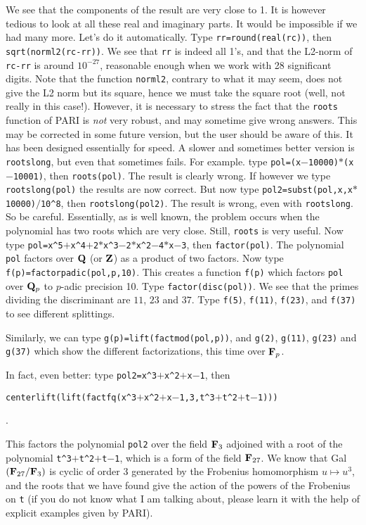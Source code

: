 We see that the components of the result are very close to 1. It is however
tedious to look at all these real and imaginary parts. It would be impossible
if we had many more. Let's do it automatically. Type {\tt rr=round(real(rc))},
then {\tt sqrt(norml2(rc-rr))}. We see that {\tt rr} is indeed all 1's, and
that the L2-norm of {\tt rc-rr} is around $10^{-27}$, reasonable enough when we
work with 28 significant digits. Note that the function {\tt norml2}, contrary
to what it may seem, does not give the L2 norm but its square, hence we must
take the square root (well, not really in this case!).
\smallskip
However, it is necessary to stress the fact that the {\tt roots} function of
PARI is {\it not} very robust, and may sometime give wrong answers. This
may be corrected in some future version, but the user should be aware of this.
It has been designed essentially for speed. A slower and sometimes better
version is {\tt rootslong}, but even that sometimes fails. For example. type
{\tt pol=(x$-$10000)$*$(x$-$10001)}, then {\tt roots(pol)}. The result is
clearly wrong. If however we type {\tt rootslong(pol)} the results are now
correct. But now type {\tt pol2=subst(pol,x,x$*$10000)$/$10\^{}8}, then
{\tt rootslong(pol2)}. The result is wrong, even with {\tt rootslong}. So be
careful. Essentially, as is well known, the problem occurs when the polynomial
has two roots which are very close. Still, {\tt roots} is very useful.
\smallskip
Now type {\tt pol=x\^{}5$+$x\^{}4$+$2$*$x\^{}3$-$2$*$x\^{}2$-$4$*$x$-$3},
then {\tt factor(pol)}. The polynomial {\tt pol} factors over ${\bf Q}$ (or ${\bf Z}$)
as a product of two factors. Now type {\tt f(p)=factorpadic(pol,p,10)}.
This creates a function {\tt f(p)} which factors {\tt pol} over ${\bf Q}_p$ to 
$p$-adic precision 10. Type {\tt factor(disc(pol))}. We see that the primes
dividing the discriminant are $11$, $23$ and $37$. Type {\tt f(5)}, 
{\tt f(11)}, {\tt f(23)}, and {\tt f(37)} to see different splittings.

Similarly, we can type {\tt g(p)=lift(factmod(pol,p))}, and {\tt g(2)},
{\tt g(11)}, {\tt g(23)} and {\tt g(37)} which show the different 
factorizations, this time over ${\bf F}_p$.

In fact, even better: type {\tt pol2=x\^{}3$+$x\^{}2$+$x$-$1}, then

\centerline{\tt centerlift(lift(factfq(x\^{}3$+$x\^{}2$+$x$-$1,3,t\^{}3$+$t\^{}2$+$t$-$1)))}.

This factors the polynomial {\tt pol2} over the field ${\bf F}_3$ adjoined
with a root of the polynomial {\tt t\^{}3$+$t\^{}2$+$t$-$1}, which is a form
of the field ${\bf F}_{27}$. We know that Gal$({\bf F}_{27}/{\bf F}_3)$ is cyclic of order
3 generated by the Frobenius homomorphism $u\mapsto u^3$, and the roots that
we have found give the action of the powers of the Frobenius on {\tt t}
(if you do not know what I am talking about, please learn it with the help
of explicit examples given by PARI).

